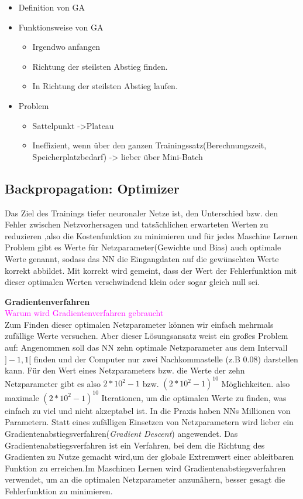 \documentclass[12pt,a4paper]{scrartcl}
\numberwithin{equation}{section}
\begin{document}
\begin{itemize}
	\item Definition von GA
	\item Funktionsweise von GA
		\begin{itemize}
			\item Irgendwo anfangen
			\item Richtung der steilsten Abstieg finden.
			\item In Richtung der steilsten Abstieg laufen.
		\end{itemize}
	\item  Problem
		\begin{itemize}
			\item Sattelpunkt ->Plateau 
			\item Ineffizient, wenn über den ganzen Trainingssatz(Berechnungszeit, Speicherplatzbedarf) -> lieber über Mini-Batch
		\end{itemize}
\end{itemize}
\subsection{Backpropagation: Optimizer}

Das Ziel des Trainings tiefer neuronaler Netze ist, den Unterschied bzw. den Fehler zwischen Netzvorhersagen und tatsächlichen erwarteten Werten zu reduzieren ,also die Kostenfunktion zu minimieren und für jedes Maschine Lernen Problem gibt es Werte für Netzparameter(Gewichte und Bias) auch optimale Werte genannt, sodass das \ac{NN} die Eingangdaten auf die gewünschten Werte korrekt abbildet. Mit korrekt wird gemeint, dass der Wert der Fehlerfunktion mit dieser optimalen Werten verschwindend klein oder sogar gleich null sei.

\textbf{Gradientenverfahren}\\
\textcolor{magenta}{Warum wird Gradientenverfahren gebraucht}\\
Zum Finden dieser optimalen Netzparameter können wir einfach mehrmals zufällige Werte versuchen. Aber dieser Lösungsansatz weist ein großes Problem auf: Angenommen soll das NN zehn optimale Netzparameter aus dem Intervall  $ ]-1,1[ $ finden und der Computer nur zwei Nachkommastelle (z.B 0.08) darstellen kann. Für den Wert eines Netzparameters bzw. die Werte der zehn Netzparameter gibt es also $ 2*10^2 - 1 $ bzw. $ (2*10^2 - 1)^{10} $ Möglichkeiten. also maximale  $ (2*10^2 - 1)^10 $ Iterationen, um die optimalen Werte zu finden, was einfach zu viel und nicht akzeptabel ist. In die Praxis haben \acsp{NN} Millionen von Parametern.
Statt eines zufälligen Einsetzen von Netzparametern wird lieber ein Gradientenabstiegsverfahren(\textit{Gradient Descent}) angewendet. Das Gradientenabstiegsverfahren ist ein Verfahren, bei dem die Richtung des Gradienten zu Nutze gemacht wird,um der globale Extremwert einer ableitbaren Funktion zu erreichen.Im Maschinen Lernen wird Gradientenabstiegsverfahren verwendet, um an die optimalen Netzparameter anzunähern, besser gesagt die Fehlerfunktion zu minimieren.
\end{document}
